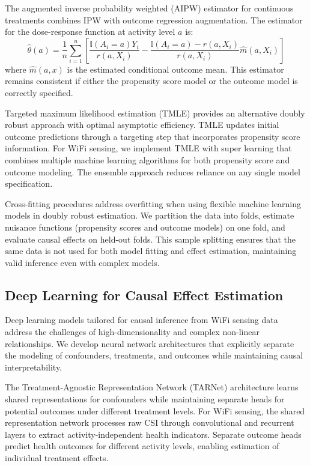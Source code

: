 \documentclass[journal]{IEEEtran}
\begin{document}
The augmented inverse probability weighted (AIPW) estimator for continuous treatments combines IPW with outcome regression augmentation. The estimator for the dose-response function at activity level $a$ is:
$$\hat{\theta}(a) = \frac{1}{n}\sum_{i=1}^n \left[ \frac{\mathbb{I}(A_i = a) Y_i}{r(a, X_i)} - \frac{\mathbb{I}(A_i = a) - r(a, X_i)}{r(a, X_i)} \hat{m}(a, X_i) \right]$$
where $\hat{m}(a, x)$ is the estimated conditional outcome mean. This estimator remains consistent if either the propensity score model or the outcome model is correctly specified.

Targeted maximum likelihood estimation (TMLE) provides an alternative doubly robust approach with optimal asymptotic efficiency. TMLE updates initial outcome predictions through a targeting step that incorporates propensity score information. For WiFi sensing, we implement TMLE with super learning that combines multiple machine learning algorithms for both propensity score and outcome modeling. The ensemble approach reduces reliance on any single model specification.

Cross-fitting procedures address overfitting when using flexible machine learning models in doubly robust estimation. We partition the data into folds, estimate nuisance functions (propensity scores and outcome models) on one fold, and evaluate causal effects on held-out folds. This sample splitting ensures that the same data is not used for both model fitting and effect estimation, maintaining valid inference even with complex models.

\subsection{Deep Learning for Causal Effect Estimation}

Deep learning models tailored for causal inference from WiFi sensing data address the challenges of high-dimensionality and complex non-linear relationships. We develop neural network architectures that explicitly separate the modeling of confounders, treatments, and outcomes while maintaining causal interpretability.

The Treatment-Agnostic Representation Network (TARNet) architecture learns shared representations for confounders while maintaining separate heads for potential outcomes under different treatment levels. For WiFi sensing, the shared representation network processes raw CSI through convolutional and recurrent layers to extract activity-independent health indicators. Separate outcome heads predict health outcomes for different activity levels, enabling estimation of individual treatment effects.
\end{document}
